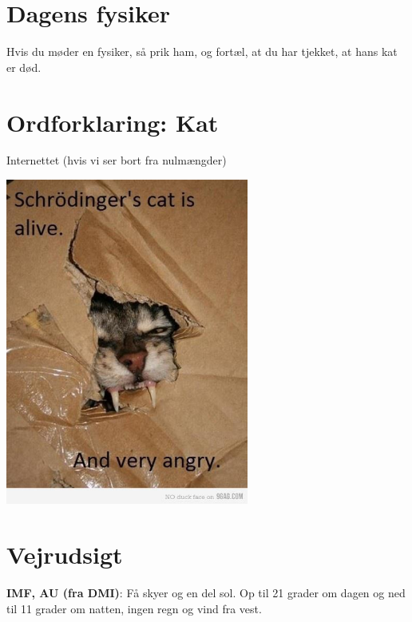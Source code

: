 

\begin{minipage}[b]{0.95\linewidth}
\begin{minipage}[t]{0.47\textwidth}
\vspace{3mm}
\section*{Dagens fysiker}
Hvis du møder en fysiker, så prik ham, og fortæl, at du har tjekket, at hans kat er død.

\section*{Ordforklaring: Kat}
Internettet (hvis vi ser bort fra nulmængder)

\begin{center}
\includegraphics[width=0.6\textwidth]{catisangry.jpg}
\end{center}

\end{minipage}%
\hfill\begin{minipage}[t]{0.47\textwidth}
\vspace{3mm}
\section*{Vejrudsigt}
\textbf{IMF, AU (fra DMI)}: Få skyer og en del sol. Op til 21 grader om dagen og ned til 11 grader om natten, ingen regn og vind fra vest.


\end{minipage}
\end{minipage}
